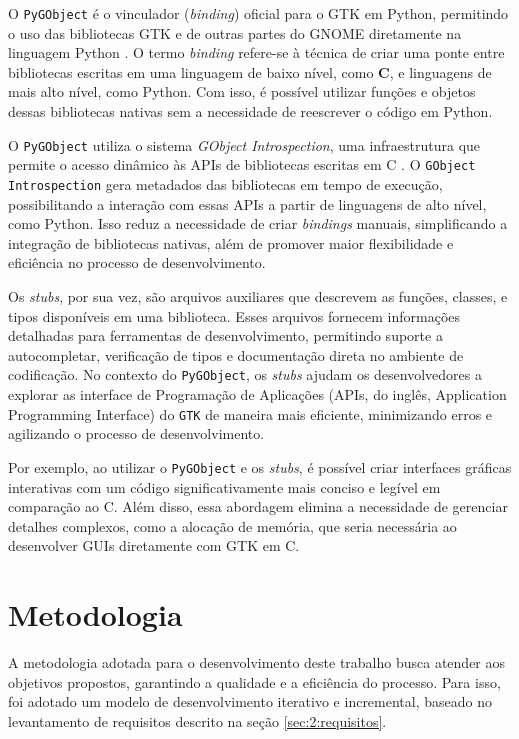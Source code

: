 O \texttt{PyGObject} é o vinculador (\textit{binding}) oficial para o GTK em Python, permitindo o uso das bibliotecas GTK e de outras partes do GNOME diretamente na linguagem Python \citep{pygobject}. O termo \textit{binding} refere-se à técnica de criar uma ponte entre bibliotecas escritas em uma linguagem de baixo nível, como \textbf{C}, e linguagens de mais alto nível, como Python. Com isso, é possível utilizar funções e objetos dessas bibliotecas nativas sem a necessidade de reescrever o código em Python.

O \texttt{PyGObject} utiliza o sistema \textit{GObject Introspection}, uma infraestrutura que permite o acesso dinâmico às APIs de bibliotecas escritas em C \citep{gobjectintrospection}. O \texttt{GObject Introspection} gera metadados das bibliotecas em tempo de execução, possibilitando a interação com essas APIs a partir de linguagens de alto nível, como Python. Isso reduz a necessidade de criar \textit{bindings} manuais, simplificando a integração de bibliotecas nativas, além de promover maior flexibilidade e eficiência no processo de desenvolvimento.

Os \textit{stubs}, por sua vez, são arquivos auxiliares que descrevem as funções, classes, e tipos disponíveis em uma biblioteca. Esses arquivos fornecem informações detalhadas para ferramentas de desenvolvimento, permitindo suporte a autocompletar, verificação de tipos e documentação direta no ambiente de codificação. No contexto do \texttt{PyGObject}, os \textit{stubs} ajudam os desenvolvedores a explorar as interface de Programação de Aplicações (APIs, do inglês, Application Programming Interface) do \texttt{GTK} de maneira mais eficiente, minimizando erros e agilizando o processo de desenvolvimento.

Por exemplo, ao utilizar o \texttt{PyGObject} e os \textit{stubs}, é possível criar interfaces gráficas interativas com um código significativamente mais conciso e legível em comparação ao C. Além disso, essa abordagem elimina a necessidade de gerenciar detalhes complexos, como a alocação de memória, que seria necessária ao desenvolver GUIs diretamente com GTK em C.

\section{Metodologia}
\label{sec:2:metodologia}

A metodologia adotada para o desenvolvimento deste trabalho busca atender aos objetivos propostos, garantindo a qualidade e a eficiência do processo. Para isso, foi adotado um modelo de desenvolvimento iterativo e incremental, baseado no levantamento de requisitos descrito na seção \ref{sec:2:requisitos}.

